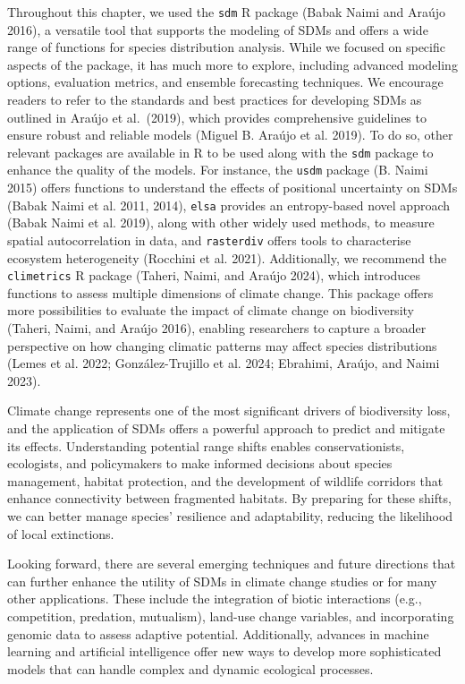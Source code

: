 \documentclass[
]{article}
\begin{document}
Throughout this chapter, we used the \texttt{sdm} R package (Babak Naimi
and Araújo 2016), a versatile tool that supports the modeling of SDMs
and offers a wide range of functions for species distribution analysis.
While we focused on specific aspects of the package, it has much more to
explore, including advanced modeling options, evaluation metrics, and
ensemble forecasting techniques. We encourage readers to refer to the
standards and best practices for developing SDMs as outlined in Araújo
et al.~(2019), which provides comprehensive guidelines to ensure robust
and reliable models (Miguel B. Araújo et al. 2019). To do so, other
relevant packages are available in R to be used along with the
\texttt{sdm} package to enhance the quality of the models. For instance,
the \texttt{usdm} package (B. Naimi 2015) offers functions to understand
the effects of positional uncertainty on SDMs (Babak Naimi et al. 2011,
2014), \texttt{elsa} provides an entropy-based novel approach (Babak
Naimi et al. 2019), along with other widely used methods, to measure
spatial autocorrelation in data, and \texttt{rasterdiv} offers tools to
characterise ecosystem heterogeneity (Rocchini et al. 2021).
Additionally, we recommend the \texttt{climetrics} R package (Taheri,
Naimi, and Araújo 2024), which introduces functions to assess multiple
dimensions of climate change. This package offers more possibilities to
evaluate the impact of climate change on biodiversity (Taheri, Naimi,
and Araújo 2016), enabling researchers to capture a broader perspective
on how changing climatic patterns may affect species distributions
(Lemes et al. 2022; González-Trujillo et al. 2024; Ebrahimi, Araújo, and
Naimi 2023).

Climate change represents one of the most significant drivers of
biodiversity loss, and the application of SDMs offers a powerful
approach to predict and mitigate its effects. Understanding potential
range shifts enables conservationists, ecologists, and policymakers to
make informed decisions about species management, habitat protection,
and the development of wildlife corridors that enhance connectivity
between fragmented habitats. By preparing for these shifts, we can
better manage species' resilience and adaptability, reducing the
likelihood of local extinctions.

Looking forward, there are several emerging techniques and future
directions that can further enhance the utility of SDMs in climate
change studies or for many other applications. These include the
integration of biotic interactions (e.g., competition, predation,
mutualism), land-use change variables, and incorporating genomic data to
assess adaptive potential. Additionally, advances in machine learning
and artificial intelligence offer new ways to develop more sophisticated
models that can handle complex and dynamic ecological processes.
\end{document}
